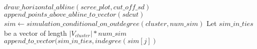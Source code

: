 \documentclass[a4paper]{article}
\begin{document}
\begin{algorithm}
\begin{algorithmic}[1]
        \State $draw\_horizontal\_abline(scree\_plot, cut\_off\_sd)$
        \State $append\_points\_above\_abline\_to\_vector(sdcut)$
        \State $sim \gets simulation\_conditional\_on\_outdegree(cluster, num\_sim)$
        \State Let $sim\_in\_ties$ be a vector of length $|V_{cluster}| * num\_sim$ 
            \State $append\_to\_vector(sim\_in\_ties, indegree(sim[j])$
        \EndFor \label{ia_jendfor}
\end{algorithmic}
\end{algorithm}

\clearpage
\end{document}
